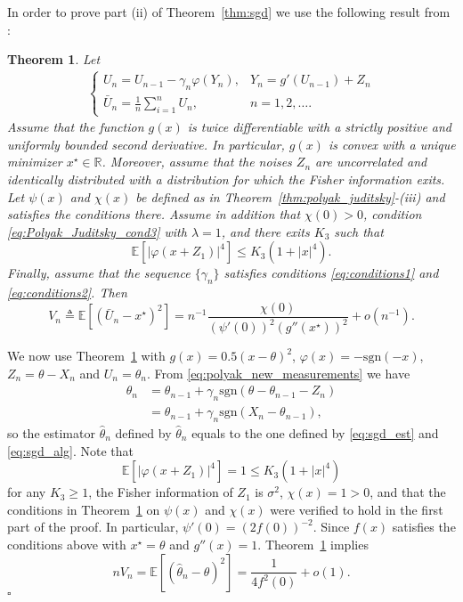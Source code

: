 \documentclass[letterpaper, 11pt]{IEEEtran}      %
\newtheorem{thm}{\bf{Theorem}}
\newcommand{\sgn}{\mathrm{sgn} }
\newcommand*{\QEDA}{\hfill\ensuremath{\square}}
\begin{document}
In order to prove part (ii) of Theorem~\ref{thm:sgd} we use the following result from \cite{polyak1990new}:
\begin{thm}{ \cite[Thm. 2]{polyak1990new}} \label{thm:polyak_new}
Let
\begin{align} \label{eq:polyak_new_measurements}
\begin{cases}
U_n = U_{n-1} - \gamma_n \varphi(Y_n), & Y_n = g'(U_{n-1})+Z_n \\
\bar{U}_n= \frac{1}{n} \sum_{i=1}^n U_n, & n=1,2,\ldots.
\end{cases}
\end{align}
Assume that the function $g(x)$ is twice differentiable with a strictly positive and uniformly bounded second derivative. In particular, $g(x)$ is convex with a unique minimizer $x^\star \in \mathbb R$. Moreover, assume that the noises $Z_n$ are uncorrelated and identically distributed with a distribution for which the Fisher information exits. Let $\psi(x)$ and $\chi(x)$ be defined as in Theorem~\ref{thm:polyak_juditsky}-(iii) and satisfies the conditions there. Assume in addition that $\chi(0)>0$, condition \eqref{eq:Polyak_Juditsky_cond3} with $\lambda = 1$, 
and there exits $K_3$ such that 
\[
\mathbb E \left[ | \varphi(x+Z_1) |^4 \right] \leq K_3(1+|x|^4). 
\]
Finally, assume that the sequence $\{\gamma_n \}$ satisfies conditions  \eqref{eq:conditions1} and \eqref{eq:conditions2}. Then
\[
V_n \triangleq \mathbb E \left[ \left(\bar{U}_n-x^\star \right)^2 \right] = n^{-1}\frac{\chi(0)} { (\psi'(0))^2 (g''(x^\star))^2 } + o(n^{-1}).
\]
\end{thm}

We now use Theorem~\ref{thm:polyak_new} with $g(x) = 0.5(x-\theta)^2$, $\varphi(x) = -\sgn(-x)$, $Z_n = \theta-X_n$ and $U_n = \theta_n$. From \eqref{eq:polyak_new_measurements} we have
\begin{align*} 
\theta_n & = \theta_{n-1} + \gamma_n \sgn(\theta-\theta_{n-1} - Z_n )  \\
& = \theta_{n-1} + \gamma_n \sgn(X_n-\theta_{n-1} ),
\end{align*}
so the estimator $\hat{\theta}_n$ defined by $\hat{\theta}_n$ equals to the one defined by \eqref{eq:sgd_est} and \eqref{eq:sgd_alg}. Note that
\[
\mathbb E \left[ | \varphi(x+Z_1) |^4 \right] = 1 \leq K_3(1+|x|^4)
\]
for any $K_3\geq 1$, the Fisher information of $Z_1$ is $\sigma^2$, $\chi(x) = 1 > 0$, and that 
the conditions in Theorem~\ref{thm:polyak_new} on $\psi(x)$ and $\chi(x)$ were verified to hold in the first part of the proof. In particular, $\psi'(0) = (2f(0))^{-2}$. Since $f(x)$ satisfies the conditions above with $x^\star = \theta$ and $g''(x) = 1$. Theorem~\ref{thm:polyak_new} implies 
\[
n V_n = \mathbb E \left[ \left(\hat{\theta}_n-\theta \right)^2 \right]  = \frac{1}{4 f^2(0)} + o(1).
\]
\QEDA
\end{document}
